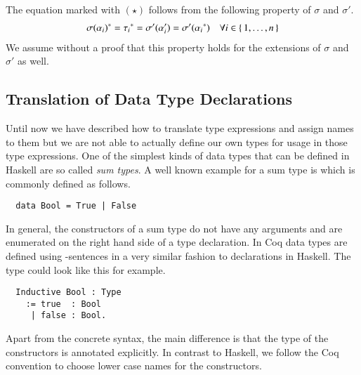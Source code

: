 The equation marked with $(\star)$ follows from the following property of $\sigma$ and $\sigma'$.
\begin{align*}
  {\sigma(\alpha_i)}^{*} = {\tau_i}^{*}
                            = \sigma'(\alpha_i')
                            = \sigma'({\alpha_i}^{*})
  &&\forall i \in \{\, 1, \ldots, n \,\}
\end{align*}
We assume without a proof that this property holds for the extensions of $\sigma$ and $\sigma'$ as well.

\subsection{Translation of Data Type Declarations}
Until now we have described how to translate type expressions and assign names to them but we are not able to actually define our own types for usage in those type expressions.
One of the simplest kinds of data types that can be defined in Haskell are so called \textit{sum types}.
A well known example for a sum type is  which is commonly defined as follows.
\begin{verbatim}
  data Bool = True | False
\end{verbatim}
In general, the constructors of a sum type do not have any arguments and are enumerated on the right hand side of a  type declaration.
In Coq data types are defined using -sentences in a very similar fashion to  declarations in Haskell.
The  type could look like this for example.
\begin{verbatim}
  Inductive Bool : Type
    := true  : Bool
     | false : Bool.
\end{verbatim}
Apart from the concrete syntax, the main difference is that the type of the constructors is annotated explicitly.
In contrast to Haskell, we follow the Coq convention to choose lower case names for the constructors.

